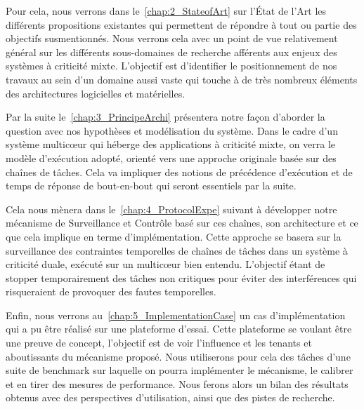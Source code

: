 \documentclass[french, a4paper, 11pt, twoside, pdftex]{StyleThese}
\begin{document}
	Pour cela, nous verrons dans le~\autoref{chap:2_StateofArt} sur l'État de l'Art les différents propositions existantes qui permettent de répondre à tout ou partie des objectifs susmentionnés. Nous verrons cela avec un point de vue relativement général sur les différents sous-domaines de recherche afférents aux enjeux des systèmes à criticité mixte. L'objectif est d'identifier le positionnement de nos travaux au sein d'un domaine aussi vaste qui touche à de très nombreux éléments des architectures logicielles et matérielles.  %
	
	Par la suite le~\autoref{chap:3_PrincipeArchi} présentera notre façon d'aborder la question avec nos hypothèses et modélisation du système. Dans le cadre d'un système multicœur qui héberge des applications à criticité mixte, on verra le modèle d'exécution adopté, orienté vers une approche originale basée sur des chaînes de tâches. Cela va impliquer des notions de précédence d'exécution et de temps de réponse de bout-en-bout qui seront essentiels par la suite.
	
	Cela nous mènera dans le~\autoref{chap:4_ProtocolExpe} suivant à développer notre mécanisme de Surveillance et Contrôle basé sur ces chaînes, son architecture et ce que cela implique en terme d'implémentation. Cette approche se basera sur la surveillance des contraintes temporelles de chaînes de tâches dans un système à criticité duale, exécuté sur un multicœur bien entendu. L'objectif étant de stopper temporairement des tâches non critiques pour éviter des interférences qui risqueraient de provoquer des fautes temporelles.
	
	Enfin, nous verrons au~\autoref{chap:5_ImplementationCase} un cas d'implémentation qui a pu être réalisé sur une plateforme d'essai. Cette plateforme se voulant être une preuve de concept, l'objectif est de voir l'influence et les tenants et aboutissants du mécanisme proposé. Nous utiliserons pour cela des tâches d'une suite de benchmark sur laquelle on pourra implémenter le mécanisme, le calibrer et en tirer des mesures de performance.
	Nous ferons alors un bilan des résultats obtenus avec des perspectives d'utilisation, ainsi que des pistes de recherche. 
    


\ifdefined{}
\else


\end{document}
